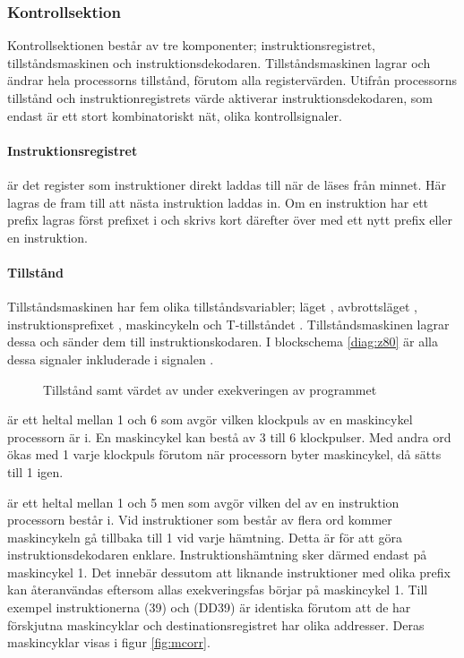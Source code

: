 \documentclass[main.tex]{subfiles}
\begin{document}
\subsubsection{Kontrollsektion}
Kontrollsektionen består av tre komponenter; instruktionsregistret,
tillståndsmaskinen och instruktionsdekodaren. Tillståndsmaskinen lagrar och
ändrar hela processorns tillstånd, förutom alla registervärden. Utifrån
processorns tillstånd och instruktionregistrets värde aktiverar
instruktionsdekodaren, som endast är ett stort kombinatoriskt nät, olika
kontrollsignaler.

\paragraph{Instruktionsregistret }
 är det register som instruktioner direkt laddas till när de läses
från minnet. Här lagras de fram till att nästa instruktion laddas in. Om en
instruktion har ett prefix lagras först prefixet i  och skrivs kort
därefter över med ett nytt prefix eller en instruktion.

\paragraph{Tillstånd}
Tillståndsmaskinen har fem olika tillståndsvariabler; läget ,
avbrottsläget , instruktionsprefixet , maskincykeln
 och T-tillståndet . Tillståndsmaskinen lagrar dessa och sänder
dem till instruktionskodaren. I blockschema \ref{diag:z80} är alla dessa
signaler inkluderade i signalen .

\begin{figure}[t]
    \center
    
    \caption{Tillstånd samt värdet av  under exekveringen av
    programmet }
    \label{fig:tim-states}
\end{figure}

 är ett heltal mellan 1 och 6 som avgör vilken klockpuls av en
maskincykel processorn är i. En maskincykel kan bestå av 3 till 6 klockpulser.
Med andra ord ökas  med 1 varje klockpuls förutom när processorn byter
maskincykel, då sätts  till 1 igen.

 är ett heltal mellan 1 och 5 men som avgör vilken del av en
instruktion processorn består i. Vid instruktioner som består av flera ord
kommer maskincykeln gå tillbaka till 1 vid varje hämtning. Detta är för att
göra instruktionsdekodaren enklare. Instruktionshämtning sker därmed endast på
maskincykel 1. Det innebär dessutom att liknande instruktioner med olika prefix
kan återanvändas eftersom allas exekveringsfas börjar på maskincykel 1. Till
exempel instruktionerna  (39) och  (DD39) är
identiska förutom att de har förskjutna maskincyklar och destinationsregistret
har olika addresser. Deras maskincyklar visas i figur \ref{fig:mcorr}.
\end{document}
